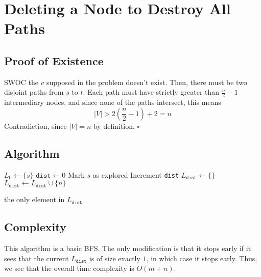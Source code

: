 \documentclass[12pt]{article}
\begin{document}
\pagebreak

\section{Deleting a Node to Destroy All Paths}

\subsection*{Proof of Existence}

SWOC the $v$ supposed in the problem doesn't exist.
Then, there must be two disjoint paths from $s$ to $t$.
Each path must have strictly greater than $\frac{n}{2}-1$ intermediary nodes,
and since none of the paths intersect, this means
\[|V| > 2\left(\frac{n}{2}-1\right)+2 = n\]
Contradiction, since $|V|=n$ by definition. $\square$

\subsection*{Algorithm}

\begin{algorithmic}[1]
    \State $L_0 \gets \{s\}$
    \State $\texttt{dist} \gets 0$
    \State Mark $s$ as explored
        \State Increment \texttt{dist}
        \State $L_{\texttt{dist}} \gets \{\}$
                    \State $L_{\texttt{dist}} \gets L_{\texttt{dist}} \cup \{n\}$
                \EndIf
            \EndFor
        \EndFor

        \item[]
            \State \Return the only element in $L_{\texttt{dist}}$
        \EndIf
    \EndWhile
\end{algorithmic}

\subsection*{Complexity}

This algorithm is a basic BFS.
The only modification is that it stops early if it sees that the current
$L_{\texttt{dist}}$ is of size exactly $1$, in which case it stops early.
Thus, we see that the overall time complexity is $O(m+n)$.

\pagebreak
\end{document}
